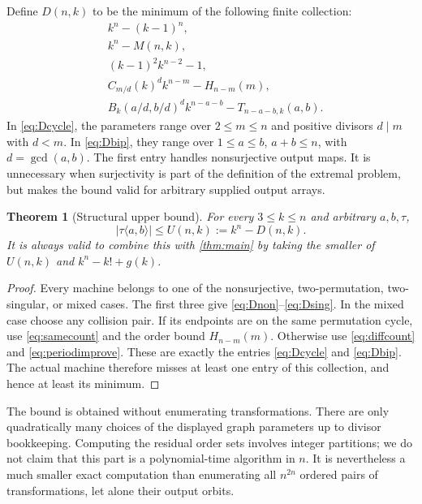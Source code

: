 \documentclass[11pt,a4paper]{article}
\numberwithin{equation}{section}
\newtheorem{theorem}{Theorem}[section]
\theoremstyle{definition}
\theoremstyle{remark}
\begin{document}
Define $D(n,k)$ to be the minimum of the following finite collection:
\begin{align}
 &k^n-(k-1)^n,\label{eq:Dnon}\\
 &k^n-M(n,k),\label{eq:Dperm}\\
 &(k-1)^2k^{n-2}-1,\label{eq:Dsing}\\
 &C_{m/d}(k)^d k^{n-m}-H_{n-m}(m),\label{eq:Dcycle}\\
 &B_k(a/d,b/d)^d k^{n-a-b}-T_{n-a-b,k}(a,b).\label{eq:Dbip}
\end{align}
In \eqref{eq:Dcycle}, the parameters range over $2\le m\le n$ and positive
divisors $d\mid m$ with $d<m$. In \eqref{eq:Dbip}, they range over
$1\le a\le b$, $a+b\le n$, with $d=\gcd(a,b)$.
The first entry handles nonsurjective output maps. It is unnecessary when
surjectivity is part of the definition of the extremal problem, but makes
the bound valid for arbitrary supplied output arrays.

\begin{theorem}[Structural upper bound]\label{thm:structural}
For every $3\le k\le n$ and arbitrary $a,b,\tau$,
\begin{equation}\label{eq:structural}
 |\tau\langle a,b\rangle|\le U(n,k):=k^n-D(n,k).
\end{equation}
It is always valid to combine this with \cref{thm:main} by taking the smaller
of $U(n,k)$ and $k^n-k!+g(k)$.
\end{theorem}
\begin{proof}
Every machine belongs to one of the nonsurjective, two-permutation,
two-singular, or mixed cases. The first three give
\eqref{eq:Dnon}--\eqref{eq:Dsing}. In the mixed case choose any collision pair.
If its endpoints are on the same permutation cycle, use
\eqref{eq:samecount} and the order bound $H_{n-m}(m)$. Otherwise use
\eqref{eq:diffcount} and \eqref{eq:periodimprove}. These are exactly the
entries \eqref{eq:Dcycle} and \eqref{eq:Dbip}. The actual machine therefore
misses at least one entry of this collection, and hence at least its minimum.
\end{proof}

The bound is obtained without enumerating transformations. There are only
quadratically many choices of the displayed graph parameters up to divisor
bookkeeping. Computing the residual order sets involves integer partitions;
we do not claim that this part is a polynomial-time algorithm in $n$.
It is nevertheless a much smaller exact computation than enumerating all
$n^{2n}$ ordered pairs of transformations, let alone their output orbits.
\end{document}
